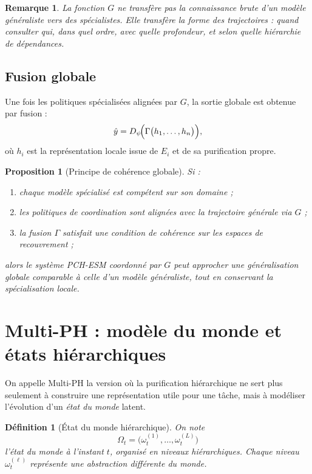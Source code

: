 \documentclass[11pt,a4paper]{article}
\newtheorem{definition}{Définition}[section]
\newtheorem{proposition}{Proposition}[section]
\newtheorem{remark}{Remarque}[section]
\newcommand{\1}{\mathbf 1}
\begin{document}
\begin{remark}
La fonction \(G\) ne transfère pas la connaissance brute d'un modèle généraliste vers des spécialistes.
Elle transfère la \emph{forme des trajectoires} : quand consulter qui, dans quel ordre, avec quelle profondeur, et selon quelle hiérarchie de dépendances.
\end{remark}

\subsection{Fusion globale}

Une fois les politiques spécialisées alignées par \(G\), la sortie globale est obtenue par fusion :
\[
\hat y
=
D_\psi\!\Bigl(
\Gamma\bigl(h_1,\dots,h_n\bigr)
\Bigr),
\]
où \(h_i\) est la représentation locale issue de \(E_i\) et de sa purification propre.

\begin{proposition}[Principe de cohérence globale]
Si :
\begin{enumerate}[leftmargin=2em]
    \item chaque modèle spécialisé est compétent sur son domaine ;
    \item les politiques de coordination sont alignées avec la trajectoire générale via \(G\) ;
    \item la fusion \(\Gamma\) satisfait une condition de cohérence sur les espaces de recouvrement ;
\end{enumerate}
alors le système PCH-ESM coordonné par \(G\) peut approcher une généralisation globale comparable à celle d'un modèle généraliste, tout en conservant la spécialisation locale.
\end{proposition}

\section{Multi-PH : modèle du monde et états hiérarchiques}

On appelle Multi-PH la version où la purification hiérarchique ne sert plus seulement à construire une représentation utile pour une tâche, mais à modéliser l'évolution d'un \emph{état du monde} latent.

\begin{definition}[État du monde hiérarchique]
On note
\[
\Omega_t = \bigl(\omega_t^{(1)},\dots,\omega_t^{(L)}\bigr)
\]
l'état du monde à l'instant \(t\), organisé en niveaux hiérarchiques.
Chaque niveau \(\omega_t^{(\ell)}\) représente une abstraction différente du monde.
\end{definition}
\end{document}
